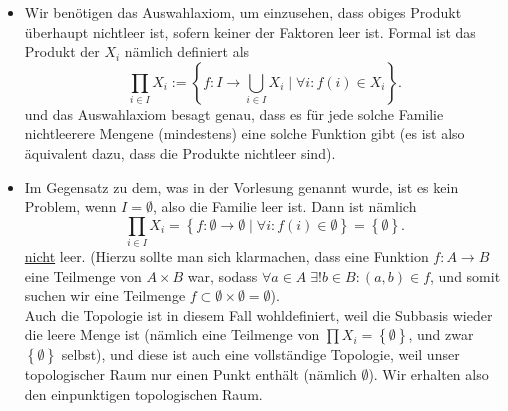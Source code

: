 \begin{remark*}
    \begin{itemize}
        \item Wir benötigen das Auswahlaxiom, um einzusehen, dass obiges Produkt überhaupt nichtleer ist, sofern keiner der Faktoren leer ist. Formal ist das Produkt der $X_i$ nämlich definiert als
     \[
         \prod_{i\in I} X_i := \left \{f: I \to  \bigcup_{i\in I} X_i \mid \forall i\colon f(i) \in X_i \right\} 
    .\] 
    und das Auswahlaxiom besagt genau, dass es für jede solche Familie nichtleerere Mengene (mindestens) eine solche Funktion gibt (es ist also äquivalent dazu, dass die Produkte nichtleer sind).
\item Im Gegensatz zu dem, was in der Vorlesung genannt wurde, ist es kein Problem, wenn $I = \emptyset$, also die Familie leer ist. Dann ist nämlich
    \[
        \prod_{i\in I} X_i = \left \{f: \emptyset \to \emptyset \mid  \forall i\colon f(i)\in \emptyset\right\} = \left \{\emptyset\right\}  
    .\] 
    \underline{nicht} leer. (Hierzu sollte man sich klarmachen, dass eine Funktion  $f:A\to B$ eine Teilmenge von $A\times B$ war, sodass $\forall a\in A \;\exists !b \in B\colon (a,b) \in f$, und somit suchen wir eine Teilmenge $f\subset \emptyset\times \emptyset = \emptyset$). \\
    Auch die Topologie ist in diesem Fall wohldefiniert, weil die Subbasis wieder die leere Menge ist (nämlich eine Teilmenge von $\prod X_i = \left \{\emptyset\right\} $, und zwar $\left \{\emptyset\right\} $ selbst), und diese ist auch eine vollständige Topologie, weil unser topologischer Raum nur einen Punkt enthält (nämlich $\emptyset$). Wir erhalten also den einpunktigen topologischen Raum.
    \end{itemize}
\end{remark*}

